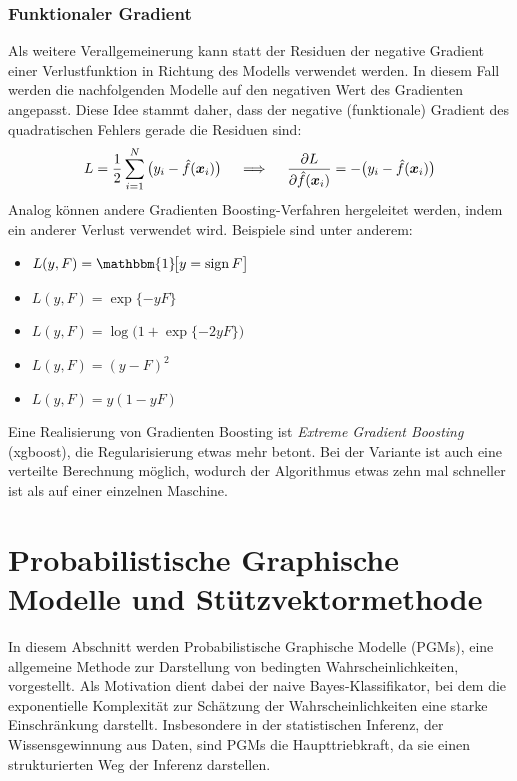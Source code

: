 		\subsection{Funktionaler Gradient}
			Als weitere Verallgemeinerung kann statt der Residuen der negative Gradient einer Verlustfunktion in Richtung des Modells verwendet werden. In diesem Fall werden die nachfolgenden Modelle auf den negativen Wert des Gradienten angepasst. Diese Idee stammt daher, dass der negative (funktionale) Gradient des quadratischen Fehlers gerade die Residuen sind:
			\begin{equation}
				L = \frac{1}{2} \sum_{i = 1}^{N} \big( y_i - \hat{f}(\bm{x}_i) \big)
				\quad\implies\quad
				\pdv{L}{\hat{f}(\bm{x}_i)} = -\big( y_i - \hat{f}(\bm{x}_i) \big)
			\end{equation}
			Analog können andere Gradienten Boosting-Verfahren hergeleitet werden, indem ein anderer Verlust verwendet wird. Beispiele sind unter anderem:
			\begin{itemize}
				\item {}    \( L(y, F) = \mathbbm{1}\!\big[ y = \sign F \big] \)
				\item {} \( L(y, F) = \exp\{ -yF \} \)
				\item {}              \( L(y, F) = \log\!\big(1 + \exp\{ -2yF \}\big) \)
				\item {}   \( L(y, F) = (y - F)^2 \)
				\item {}   \( L(y, F) = y (1 - yF) \)
			\end{itemize}
			Eine Realisierung von Gradienten Boosting ist \emph{Extreme Gradient Boosting} (xgboost), die Regularisierung etwas mehr betont. Bei der Variante ist auch eine verteilte Berechnung möglich, wodurch der Algorithmus etwas zehn mal schneller ist als auf einer einzelnen Maschine.

\chapter{Probabilistische Graphische Modelle und Stützvektormethode}
	In diesem Abschnitt werden Probabilistische Graphische Modelle (PGMs), eine allgemeine Methode zur Darstellung von bedingten Wahrscheinlichkeiten, vorgestellt. Als Motivation dient dabei der naive Bayes-Klassifikator, bei dem die exponentielle Komplexität zur Schätzung der Wahrscheinlichkeiten eine starke Einschränkung darstellt. Insbesondere in der statistischen Inferenz, der Wissensgewinnung aus Daten, sind PGMs die Haupttriebkraft, da sie einen strukturierten Weg der Inferenz darstellen.


